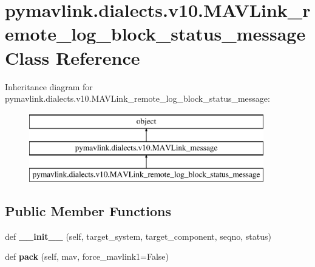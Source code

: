 \hypertarget{classpymavlink_1_1dialects_1_1v10_1_1MAVLink__remote__log__block__status__message}{}\section{pymavlink.\+dialects.\+v10.\+M\+A\+V\+Link\+\_\+remote\+\_\+log\+\_\+block\+\_\+status\+\_\+message Class Reference}
\label{classpymavlink_1_1dialects_1_1v10_1_1MAVLink__remote__log__block__status__message}
Inheritance diagram for pymavlink.\+dialects.\+v10.\+M\+A\+V\+Link\+\_\+remote\+\_\+log\+\_\+block\+\_\+status\+\_\+message\+:\begin{figure}[H]
\begin{center}
\leavevmode
\includegraphics[height=3.000000cm]{classpymavlink_1_1dialects_1_1v10_1_1MAVLink__remote__log__block__status__message}
\end{center}
\end{figure}
\subsection*{Public Member Functions}
\begin{DoxyCompactItemize}
\item 
\mbox{\label{classpymavlink_1_1dialects_1_1v10_1_1MAVLink__remote__log__block__status__message_ae273c359907271409b436cca8245d8d3}} 
def {\bfseries \+\_\+\+\_\+init\+\_\+\+\_\+} (self, target\+\_\+system, target\+\_\+component, seqno, status)
\item 
\mbox{\label{classpymavlink_1_1dialects_1_1v10_1_1MAVLink__remote__log__block__status__message_a608f52acd710cd1b1d3d3248a3250647}} 
def {\bfseries pack} (self, mav, force\+\_\+mavlink1=False)
\end{DoxyCompactItemize}
